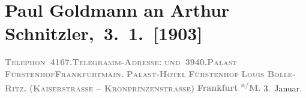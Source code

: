 

         
         \renewcommand{\erwaehntePersonen}{Personen:  ?? [Partner von Theodore Rottenberg, Ende 1902/Anfang 1903], Louis Bolle-Ritz, Heinrich Heine, Elise Krinitz, Theodore Rottenberg, Olga Schnitzler, Heinrich Schnitzler}
         \renewcommand{\erwaehnteOrte}{Orte: Frankfurt am Main, Fürstenhof, Kaiserstraße, Monte Carlo, Münchener Straße, Wien}
         \renewcommand{\erwaehnteWerke}{Werke: Gedichte an die Mouche}
               \section[ Paul Goldmann an Arthur Schnitzler, 3. 1. {[}1903{]}]{ Paul Goldmann an Arthur Schnitzler, 3. 1. {[}1903{]}}\nopagebreak{}\rehead{ }\begin{ledgroupsized}[t]{13cm}\normalsize\beginnumbering \toendnotes[C]{\smallbreak\pagebreak[2]} 
\toendnotes[C]{\smallbreak}\pstart
           \noindent{}{\pb}\textcolor{gray}{\textbf{\textsc{Telephon \textbf{4167.}}}}\hfill \textcolor{gray}{\textbf{\textsc{Telegramm-Adresse:}}}\pend
           \pstart
           \textcolor{gray}{\textbf{\textsc{und \textbf{3940.}}}}\hfill \textcolor{gray}{\textbf{\textbf{\textsc{Palast FürstenhofFrankfurtmain.}}}}\pend
           \pstart
           \centering{}\textcolor{gray}{\textbf{\textsc{\textbf{Palast-Hotel}}}}\pend
           \pstart
           \noindent{}\centering{}\textcolor{gray}{\textbf{\textsc{Fürstenhof}}}\pend
           \pstart
           \noindent{}\centering{}\textcolor{gray}{\textbf{\textsc{Louis Bolle-Ritz.}}}\pend
           \pstart
           \noindent{}\centering{}\textcolor{gray}{\textbf{\textsc{(Kaiserstrasse – Kronprinzenstrasse)}}}\pend
           \pstart
           \raggedleft{}\textcolor{gray}{\textbf{Frankfurt \textsuperscript{a/}M.}}{ }3. Januar.\pend

\end{ledgroupsized}
